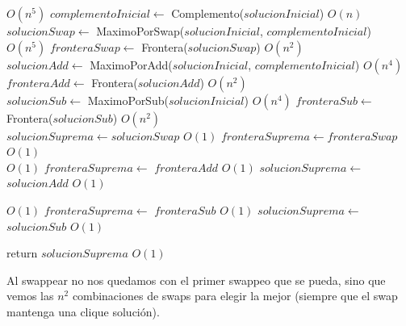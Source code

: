 \begin{algorithm}[H]
\begin{algorithmic}
             \Comment $O(n^5)$
    \State $complementoInicial \gets$ Complemento($solucionInicial$) \Comment $O(n)$\\

    \State $solucionSwap \gets$ MaximoPorSwap($solucionInicial$, $complementoInicial$)  \Comment $O(n^5)$
    \State $fronteraSwap \gets$ Frontera($solucionSwap$)                                \Comment $O(n^2)$ \\

    \State $solucionAdd \gets$ MaximoPorAdd($solucionInicial$, $complementoInicial$)    \Comment $O(n^4)$
    \State $fronteraAdd \gets$ Frontera($solucionAdd$)                                  \Comment $O(n^2)$\\

    \State $solucionSub \gets$ MaximoPorSub($solucionInicial$)      \Comment $O(n^4)$
    \State $fronteraSub \gets$ Frontera($solucionSub$)              \Comment $O(n^2)$\\

    \State $solucionSuprema \gets solucionSwap$ \Comment $O(1)$
    \State $fronteraSuprema \gets fronteraSwap$ \Comment $O(1)$\\

                    \Comment $O(1)$
        \State $fronteraSuprema \gets$ $fronteraAdd$    \Comment $O(1)$
        \State $solucionSuprema \gets$ $solucionAdd$    \Comment $O(1)$\\
    \EndIf

                    \Comment $O(1)$
        \State $fronteraSuprema \gets$ $fronteraSub$    \Comment $O(1)$
        \State $solucionSuprema \gets$ $solucionSub$    \Comment $O(1)$\\
    \EndIf

    \State return $solucionSuprema$                     \Comment $O(1)$
\EndFunction

\end{algorithmic}
\end{algorithm}

Al swappear no nos quedamos con el primer swappeo que se pueda, sino que vemos las $n^2$ combinaciones de swaps para elegir la mejor (siempre que el swap mantenga una clique solución).

